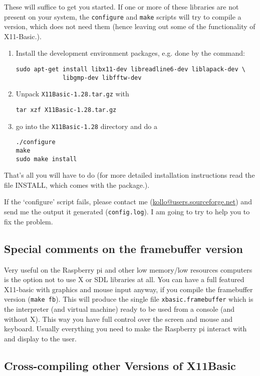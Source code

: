 These will suffice to get you started. If one or more of these libraries are
not present on your system, the \verb|configure| and \verb|make| scripts will
try to compile a version, which does not need them (hence leaving out some of
the functionality of X11-Basic.).

\begin{enumerate}
\item Install the development environment packages, e.g. done by the command:
\begin{verbatim}
sudo apt-get install libx11-dev libreadline6-dev liblapack-dev \
             libgmp-dev libfftw-dev 
\end{verbatim}

\item Unpack \verb|X11Basic-1.28.tar.gz| with 
\begin{verbatim}
tar xzf X11Basic-1.28.tar.gz
\end{verbatim}
\item go into the \verb|X11Basic-1.28| directory and do a 
\begin{verbatim}
./configure
make
sudo make install
\end{verbatim}
\end{enumerate}
That's all you will have to do (for more detailed installation instructions read
the file INSTALL, which comes with the package.).

If the `configure' script fails, please contact me
(\url{kollo@users.sourceforge.net}) and send me the output it generated
(\verb|config.log|). I am going to try to help you to fix the problem.

\subsection*{Special comments on the framebuffer version}

Very useful on the Raspberry pi and other low memory/low resources computers 
is the option not to use X or SDL libraries at all. You can have a full 
featured X11-basic with graphics and mouse input anyway, if you compile the 
framebuffer version (\verb|make fb|). This will produce the single file 
\verb|xbasic.framebuffer| which is the interpreter (and virtual machine) 
ready to be used from a console (and without X). This way you have full control 
over the screen and mouse and keyboard. Usually everything you need to make the 
Raspberry pi interact with and display to the user. 

\subsection*{Cross-compiling other Versions of X11Basic}

